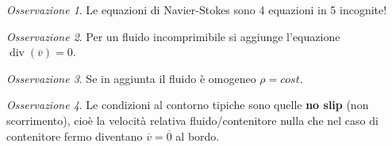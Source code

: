 \documentclass{book}
\theoremstyle{plain}
\theoremstyle{plain}
\theoremstyle{plain}
\theoremstyle{plain}
\theoremstyle{plain}
\theoremstyle{definition}
\theoremstyle{remark}
\newtheorem*{oss}{Osservazione}
\theoremstyle{definition}
\begin{document}
\begin{oss}
    Le equazioni di Navier-Stokes sono 4 equazioni in 5 incognite!
\end{oss}

\begin{oss}
    Per un fluido incomprimibile si aggiunge l'equazione $\operatorname{div}(\overline{v})=0$.
\end{oss}

\begin{oss}
    Se in aggiunta il fluido è omogeneo $\rho = cost$.
\end{oss}

\begin{oss}
    Le condizioni al contorno tipiche sono quelle \textbf{no slip} (non scorrimento), cioè la velocità relativa fluido/contenitore nulla che nel caso di contenitore fermo diventano $\overline{v}=\overline{0}$ al bordo.
\end{oss}
\end{document}
